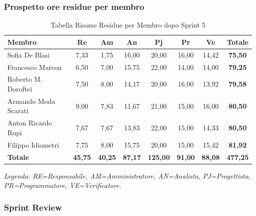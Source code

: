 \subsubsection{Prospetto ore residue per membro}
\begin{table}[H]
    \centering
    \renewcommand{\arraystretch}{1.3}
    \begin{tabularx}{\textwidth}{|X|c|c|c|c|c|c|c|}
        \hline
        \textbf{Membro} & \textbf{Re} & \textbf{Am} & \textbf{An} & \textbf{Pj} & \textbf{Pr} & \textbf{Ve} & \textbf{Totale} \\
        \hline
        Sofia De Blasi       & 7,33 & 1,75 & 16,00 & 20,00 & 16,00 & 14,42 & \textbf{75,50} \\
        Francesco Marcon     & 6,50 & 7,00 & 15,75 & 22,00 & 14,00 & 14,00 & \textbf{79,25} \\
        Roberto M. Doroftei  & 7,50 & 8,00 & 14,17 & 20,00 & 16,00 & 13,92 & \textbf{79,58} \\
        Armando Moda Scarati & 9,00 & 7,83 & 11,67 & 21,00 & 15,00 & 16,00 & \textbf{80,50} \\
        Anton Ricardo Rupi   & 7,67 & 7,67 & 13,83 & 22,00 & 15,00 & 14,33 & \textbf{80,50} \\
        Filippo Idiometri    & 7,75 & 8,00 & 15,75 & 20,00 & 15,00 & 15,42 & \textbf{81,92} \\
        \hline
        \textbf{Totale} & \textbf{45,75} & \textbf{40,25} & \textbf{87,17} & \textbf{125,00} & \textbf{91,00} & \textbf{88,08} & \textbf{477,25} \\
        \hline
    \end{tabularx}
    \begin{minipage}{\textwidth}
        \smallskip
        \footnotesize\textit{Legenda: RE=Responsabile, AM=Amministratore, AN=Analista, PJ=Progettista, PR=Programmatore, VE=Verificatore.}
    \end{minipage}
    \caption{Tabella Risorse Residue per Membro dopo Sprint 5}
\end{table}

\subsubsection{Sprint Review}

